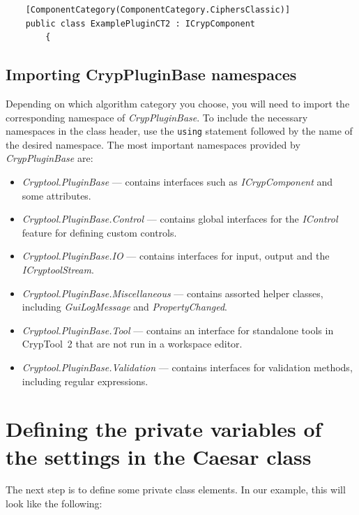 \begin{lstlisting}
    [ComponentCategory(ComponentCategory.CiphersClassic)]
    public class ExamplePluginCT2 : ICrypComponent
		{
\end{lstlisting}

\subsection{Importing CrypPluginBase namespaces}
\label{sec:ImportingCrypPluginBaseNamespaces}

Depending on which algorithm category you choose, you will need to import the corresponding name\-space of \textit{CrypPluginBase}. To include the necessary namespaces in the class header, use the \texttt{using} statement followed by the name of the desired namespace. The most important namespaces provided by \textit{CrypPluginBase} are:

\begin{itemize}
	\item \textit{Cryptool.PluginBase} --- contains interfaces such as \textit{ICrypComponent} and some attributes.
	\item \textit{Cryptool.PluginBase.Control} --- contains global interfaces for the \textit{IControl} feature for defining custom controls.
	\item \textit{Cryptool.PluginBase.IO} --- contains interfaces for input, output and the \textit{ICryptoolStream}.
	\item \textit{Cryptool.PluginBase.Miscellaneous} --- contains assorted helper classes, including \textit{GuiLogMessage} and \textit{PropertyChanged}.
	\item \textit{Cryptool.PluginBase.Tool} --- contains an interface for standalone tools in CrypTool~2 that are not run in a workspace editor.
	\item \textit{Cryptool.PluginBase.Validation} --- contains interfaces for validation methods, including regular expressions.
\end{itemize}

\section{Defining the private variables of the settings in the Caesar class}
\label{sec:DefiningThePrivateVariablesOfTheSettingsInTheCaesarClass}

The next step is to define some private class elements. In our example, this will look like the following:

